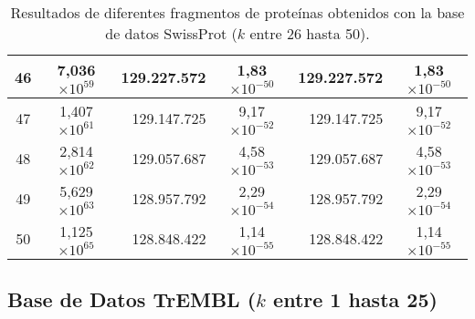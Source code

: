 \begin{table}[!hbt]
\begin{tabular}{| c  r  r  c  r  c |}
    46 & \multicolumn{1}{c}{7,036$\times 10^{59}$} & 129.227.572 & 1,83$\times 10^{-50}$ & 129.227.572 & 1,83$\times 10^{-50}$ \\ \hline  
    47 & \multicolumn{1}{c}{1,407$\times 10^{61}$} & 129.147.725 & 9,17$\times 10^{-52}$ & 129.147.725 & 9,17$\times 10^{-52}$ \\ \hline
    48 & \multicolumn{1}{c}{2,814$\times 10^{62}$} & 129.057.687 & 4,58$\times 10^{-53}$ & 129.057.687 & 4,58$\times 10^{-53}$ \\ \hline  
    49 & \multicolumn{1}{c}{5,629$\times 10^{63}$} & 128.957.792 & 2,29$\times 10^{-54}$ & 128.957.792 & 2,29$\times 10^{-54}$ \\ \hline
    50 & \multicolumn{1}{c}{1,125$\times 10^{65}$} & 128.848.422 & 1,14$\times 10^{-55}$ & 128.848.422 & 1,14$\times 10^{-55}$ \\ \hline       
    \end{tabular}
    \caption{Resultados de diferentes fragmentos de proteínas obtenidos con la base de datos SwissProt ($k$ entre 26 hasta 50).}
    \label{tb:labela12}
\end{table}

\newpage

\subsection*{Base de Datos TrEMBL ($k$ entre 1 hasta 25)}

